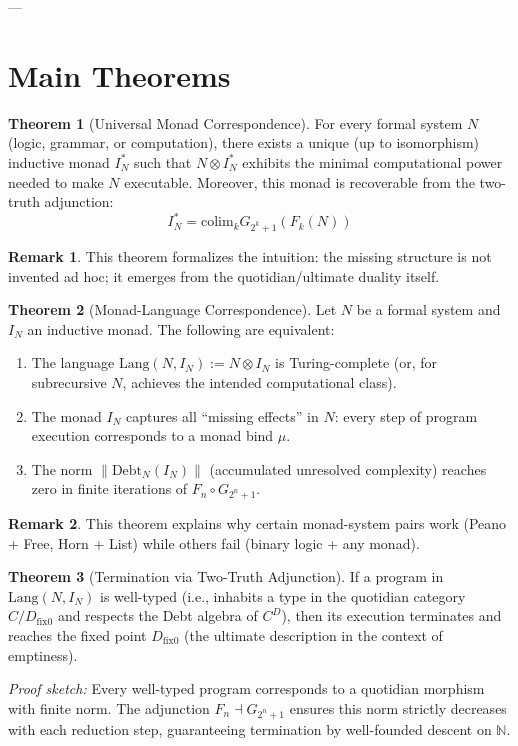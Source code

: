 \documentclass[a4paper,11pt]{article}
\theoremstyle{definition}
\newtheorem{theorem}{Theorem}[section]
\newtheorem{remark}{Remark}[section]
\begin{document}
---

\section{Main Theorems}

\begin{theorem}[Universal Monad Correspondence]
\label{thm:universal}
For every formal system $N$ (logic, grammar, or computation), there exists a unique (up to isomorphism) inductive monad $I_N^*$ such that $N \otimes I_N^*$ exhibits the minimal computational power needed to make $N$ executable. Moreover, this monad is recoverable from the two-truth adjunction:
\[
  I_N^* = \text{colim}_{k} G_{2^k+1}(F_k(N))
\]
\end{theorem}

\begin{remark}
This theorem formalizes the intuition: the missing structure is not invented ad hoc; it emerges from the quotidian/ultimate duality itself.
\end{remark}

\begin{theorem}[Monad-Language Correspondence]
\label{thm:correspondence}
Let $N$ be a formal system and $I_N$ an inductive monad. The following are equivalent:

\begin{enumerate}
  \item The language $\text{Lang}(N, I_N) := N \otimes I_N$ is Turing-complete (or, for subrecursive $N$, achieves the intended computational class).
  \item The monad $I_N$ captures all ``missing effects'' in $N$: every step of program execution corresponds to a monad bind $\mu$.
  \item The norm $\|\text{Debt}_N(I_N)\|$ (accumulated unresolved complexity) reaches zero in finite iterations of $F_n \circ G_{2^n+1}$.
\end{enumerate}
\end{theorem}

\begin{remark}
This theorem explains why certain monad-system pairs work (Peano + Free, Horn + List) while others fail (binary logic + any monad).
\end{remark}

\begin{theorem}[Termination via Two-Truth Adjunction]
\label{thm:termination}
If a program in $\text{Lang}(N, I_N)$ is well-typed (i.e., inhabits a type in the quotidian category $C/D_{\mathrm{fix}0}$ and respects the Debt algebra of $C^D$), then its execution terminates and reaches the fixed point $D_{\mathrm{fix}0}$ (the ultimate description in the context of emptiness).

\emph{Proof sketch:} Every well-typed program corresponds to a quotidian morphism with finite norm. The adjunction $F_n \dashv G_{2^n+1}$ ensures this norm strictly decreases with each reduction step, guaranteeing termination by well-founded descent on $\mathbb{N}$.
\end{theorem}
\end{document}
